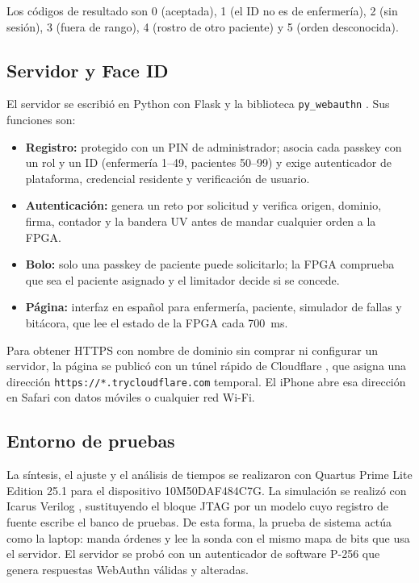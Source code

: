 \documentclass[11pt,letterpaper]{article}
\newcommand{\code}[1]{\texttt{#1}}
\begin{document}
Los códigos de resultado son 0 (aceptada), 1 (el ID no es de enfermería), 2 (sin sesión), 3 (fuera de rango), 4 (rostro de otro paciente) y 5 (orden desconocida).

\subsection{Servidor y Face ID}\label{sec:servidor}
El servidor se escribió en Python con Flask \cite{flask} y la biblioteca \code{py\_webauthn} \cite{pywebauthn}. Sus funciones son:
\begin{itemize}
\item \textbf{Registro:} protegido con un PIN de administrador; asocia cada passkey con un rol y un ID (enfermería 1--49, pacientes 50--99) y exige autenticador de plataforma, credencial residente y verificación de usuario.
\item \textbf{Autenticación:} genera un reto por solicitud y verifica origen, dominio, firma, contador y la bandera UV antes de mandar cualquier orden a la FPGA.
\item \textbf{Bolo:} solo una passkey de paciente puede solicitarlo; la FPGA comprueba que sea el paciente asignado y el limitador decide si se concede.
\item \textbf{Página:} interfaz en español para enfermería, paciente, simulador de fallas y bitácora, que lee el estado de la FPGA cada 700~ms.
\end{itemize}

Para obtener HTTPS con nombre de dominio sin comprar ni configurar un servidor, la página se publicó con un túnel rápido de Cloudflare \cite{cloudflare}, que asigna una dirección \code{https://*.trycloudflare.com} temporal. El iPhone abre esa dirección en Safari con datos móviles o cualquier red Wi-Fi.

\subsection{Entorno de pruebas}
La síntesis, el ajuste y el análisis de tiempos se realizaron con Quartus Prime Lite Edition 25.1 para el dispositivo 10M50DAF484C7G. La simulación se realizó con Icarus Verilog \cite{iverilog}, sustituyendo el bloque JTAG por un modelo cuyo registro de fuente escribe el banco de pruebas. De esta forma, la prueba de sistema actúa como la laptop: manda órdenes y lee la sonda con el mismo mapa de bits que usa el servidor. El servidor se probó con un autenticador de software P-256 que genera respuestas WebAuthn válidas y alteradas.
\end{document}
